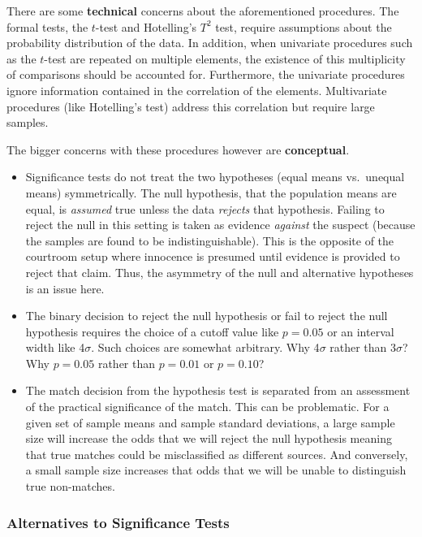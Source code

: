 \documentclass[]{book}
\providecommand{\tightlist}{%
  \setlength{\itemsep}{0pt}\setlength{\parskip}{0pt}}
\theoremstyle{definition}
\theoremstyle{definition}
\theoremstyle{remark}
\begin{document}
There are some \textbf{technical} concerns about the aforementioned
procedures. The formal tests, the \(t\)-test and Hotelling's \(T^2\)
test, require assumptions about the probability distribution of the
data. In addition, when univariate procedures such as the \(t\)-test are
repeated on multiple elements, the existence of this multiplicity of
comparisons should be accounted for. Furthermore, the univariate
procedures ignore information contained in the correlation of the
elements. Multivariate procedures (like Hotelling's test) address this
correlation but require large samples.

The bigger concerns with these procedures however are
\textbf{conceptual}.

\begin{itemize}
\tightlist
\item
  Significance tests do not treat the two hypotheses (equal means
  vs.~unequal means) symmetrically. The null hypothesis, that the
  population means are equal, is \emph{assumed} true unless the data
  \emph{rejects} that hypothesis. Failing to reject the null in this
  setting is taken as evidence \emph{against} the suspect (because the
  samples are found to be indistinguishable). This is the opposite of
  the courtroom setup where innocence is presumed until evidence is
  provided to reject that claim. Thus, the asymmetry of the null and
  alternative hypotheses is an issue here.
\item
  The binary decision to reject the null hypothesis or fail to reject
  the null hypothesis requires the choice of a cutoff value like
  \(p = 0.05\) or an interval width like 4\(\sigma\). Such choices are
  somewhat arbitrary. Why 4\(\sigma\) rather than 3\(\sigma\)? Why
  \(p = 0.05\) rather than \(p = 0.01\) or \(p = 0.10\)?
\item
  The match decision from the hypothesis test is separated from an
  assessment of the practical significance of the match. This can be
  problematic. For a given set of sample means and sample standard
  deviations, a large sample size will increase the odds that we will
  reject the null hypothesis meaning that true matches could be
  misclassified as different sources. And conversely, a small sample
  size increases that odds that we will be unable to distinguish true
  non-matches. 
\end{itemize}

\subsubsection{Alternatives to Significance
Tests}\label{alternatives-to-significance-tests}
\end{document}
